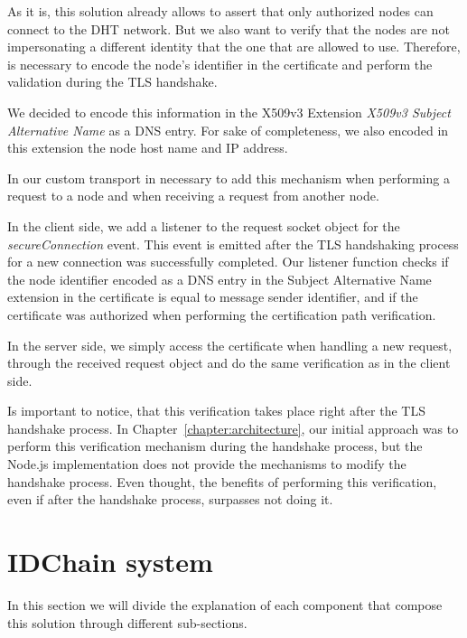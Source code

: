

As it is, this solution already allows to assert that only authorized nodes can connect to the DHT network.
But we also want to verify that the nodes are not impersonating a different identity that the one that are allowed to use.
Therefore, is necessary to encode the node's identifier in the certificate and perform the validation during the TLS handshake.

We decided to encode this information in the X509v3 Extension \textit{X509v3 Subject Alternative Name} as a DNS entry.
For sake of completeness, we also encoded in this extension the node host name and IP address.

In our custom transport in necessary to add this mechanism when performing a request to a node and when receiving a request from another node.

In the client side, we add a listener to the request socket object for the \textit{secureConnection} event.
This event is emitted after the TLS handshaking process for a new connection was successfully completed.
Our listener function checks if the node identifier encoded as a DNS entry in the Subject Alternative Name extension in the certificate is equal to message sender identifier, and if the certificate was authorized when performing the certification path verification.


In the server side, we simply access the certificate when handling a new request, through the received request object and do the same verification as in the client side.

Is important to notice, that this verification takes place right after the TLS handshake process.
In Chapter~\ref{chapter:architecture}, our initial approach was to perform this verification mechanism during the handshake process, but the Node.js implementation does not provide the mechanisms to modify the handshake process.
Even thought, the benefits of performing this verification, even if after the handshake process, surpasses not doing it.

\section{IDChain system}\label{implementation:idchain}

In this section we will divide the explanation of each component that compose this solution through different sub-sections.


